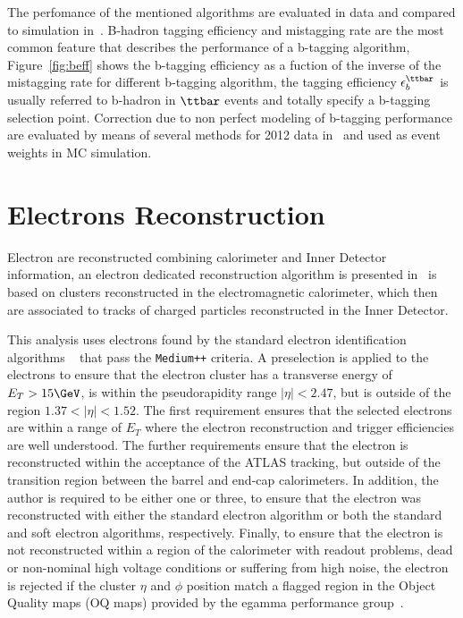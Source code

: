 The perfomance of the mentioned algorithms are evaluated in data  and compared to simulation in~\cite{btagPerf}.
B-hadron tagging efficiency and mistagging rate are the most common feature that describes the performance of a
b-tagging algorithm, Figure~\ref{fig:beff} shows the b-tagging efficiency as a fuction of the inverse of the mistagging rate
for different b-tagging algorithm, the tagging efficiency $\epsilon_b^{\ttbar}$ is usually referred to b-hadron in $\ttbar$ events
and totally specify a b-tagging selection point.
Correction due to non perfect modeling of b-tagging performance are evaluated by means of several methods
for 2012 data in~\cite{BtaggingScaleFactors, BtaggingScaleFactorsNew} and used as event weights in MC simulation.



\section{Electrons Reconstruction} \label{sec:elec}
Electron are reconstructed combining calorimeter and Inner Detector information,
an electron dedicated reconstruction algorithm is presented in~\cite{electronAlgo} is based on clusters reconstructed in the electromagnetic
calorimeter, which then are associated to tracks of charged particles reconstructed in the Inner Detector.


This analysis uses electrons found by the standard electron
identification algorithms ~\cite{AtlasCSCBook} that pass the {\tt Medium++}
criteria. A preselection is applied to the electrons to ensure that
the electron cluster has a transverse energy of $E_T > 15\GeV$, is
within the pseudorapidity range $|\eta|<2.47$, but is outside of the region
$1.37<|\eta|<1.52$. The first requirement ensures that the selected
electrons are within a range of $E_T$ where the electron reconstruction
and trigger efficiencies are well understood. The further requirements
ensure that the electron is reconstructed within the acceptance of
the ATLAS tracking, but outside of the transition region between the
barrel and end-cap calorimeters. 
In addition, the author is required to be either one or three, to ensure that the electron was 
reconstructed with either the standard electron algorithm or both the
standard and soft electron algorithms, respectively.
Finally, to ensure that the electron is not reconstructed within a region of the
calorimeter with readout problems, dead or non-nominal high voltage
conditions or suffering from high noise, the electron is rejected if
the cluster $\eta$ and $\phi$ position match a flagged region in the
Object Quality maps (OQ maps) provided by the egamma
performance group~\cite{EGammaRecomendations}.

